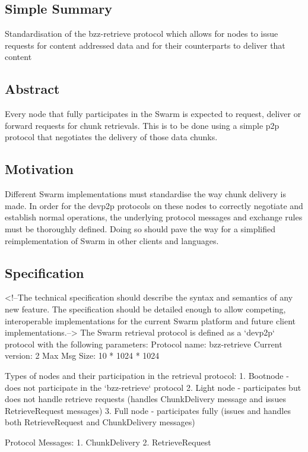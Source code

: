 \subsection{Simple Summary}
Standardisation of the bzz-retrieve protocol which allows for nodes to issue requests for content addressed data and for their counterparts to deliver that content

\subsection{Abstract}
Every node that fully participates in the Swarm is expected to request, deliver or forward requests for chunk retrievals. This is to be done using a simple p2p protocol that negotiates the delivery of those data chunks.

\subsection{Motivation}
Different Swarm implementations must standardise the way chunk delivery is made. In order for the devp2p protocols on these nodes to correctly negotiate and establish normal operations, the underlying protocol messages and exchange rules must be thoroughly defined. Doing so should pave the way for a simplified reimplementation of Swarm in other clients and languages.

\subsection{Specification}
<!--The technical specification should describe the syntax and semantics of any new feature. The specification should be detailed enough to allow competing, interoperable implementations for the current Swarm platform and future client implementations.-->
The Swarm retrieval protocol is defined as a `devp2p` protocol with the following parameters:
Protocol name:    bzz-retrieve
Current version:  2
Max Msg Size:     10 * 1024 * 1024

Types of nodes and their participation in the retrieval protocol:
1. Bootnode - does not participate in the `bzz-retrieve` protocol
2. Light node - participates but does not handle retrieve requests (handles ChunkDelivery message and issues RetrieveRequest messages)
3. Full node - participates fully (issues and handles both RetrieveRequest and ChunkDelivery messages)

Protocol Messages:
1. ChunkDelivery
2. RetrieveRequest

